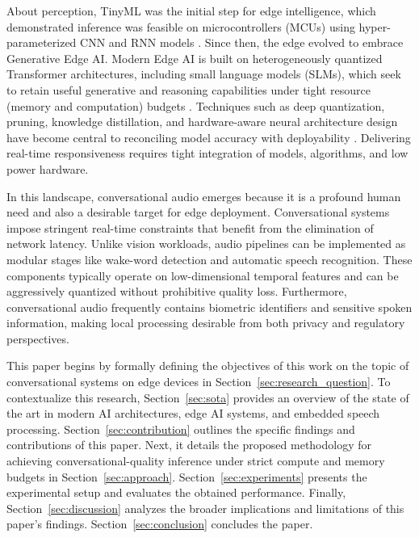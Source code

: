 \documentclass[conference]{IEEEtran}
\begin{document}
About perception, TinyML was the initial step for edge intelligence, which demonstrated inference was feasible on microcontrollers (MCUs) using hyper-parameterized CNN and RNN models \cite{10177729} \cite{mi13060851}. Since then, the edge evolved to embrace Generative Edge AI. Modern Edge AI is built on heterogeneously quantized Transformer architectures, including small language models (SLMs), which seek to retain useful generative and reasoning capabilities under tight resource (memory and computation) budgets \cite{technologies12060081, electronics14173468}. Techniques such as deep quantization, pruning, knowledge distillation, and hardware-aware neural architecture design have become central to reconciling model accuracy with deployability \cite{s25103191}.
Delivering real-time responsiveness requires tight integration of models, algorithms, and low power hardware. 

In this landscape, conversational audio emerges because it is a profound human need \cite{Seltzer2012} and also a desirable target for edge deployment. Conversational systems impose stringent real-time constraints that benefit from the elimination of network latency. Unlike vision workloads, audio pipelines can be implemented as modular stages like wake-word detection and automatic speech recognition. These components typically operate on low-dimensional temporal features and can be aggressively quantized without prohibitive quality loss. Furthermore, conversational audio frequently contains biometric identifiers and sensitive spoken information, making local processing desirable from both privacy and regulatory perspectives.

This paper begins by formally defining the objectives of this work on the topic of conversational systems on edge devices in Section~\ref{sec:research_question}. To contextualize this research, Section~\ref{sec:sota} provides an overview of the state of the art in modern AI architectures, edge AI systems, and embedded speech processing. Section~\ref{sec:contribution} outlines the specific findings and contributions of this paper. Next, it details the proposed methodology for achieving conversational-quality inference under strict compute and memory budgets in Section~\ref{sec:approach}. Section~\ref{sec:experiments} presents the experimental setup and evaluates the obtained performance. Finally, Section~\ref{sec:discussion} analyzes the broader implications and limitations of this paper's findings. Section~\ref{sec:conclusion} concludes the paper.
\end{document}
